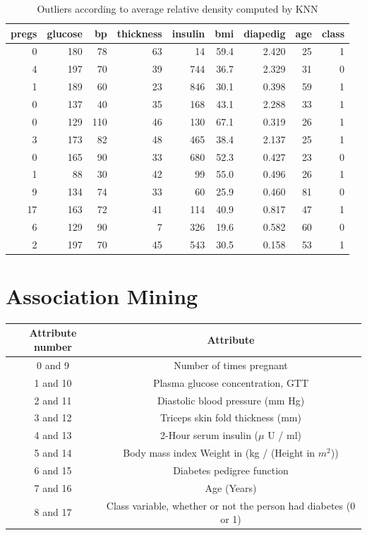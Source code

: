 \begin{table}[hbp]
\begin{tabular}{rrrrrrrrr}
pregs & glucose & bp & thickness & insulin & bmi & dia\textunderscore{}pedig & age & class\\
  \hline
0 & 180 & 78 & 63 & 14 & 59.4 & 2.420 & 25 & 1\\
4 & 197 & 70 & 39 & 744 & 36.7 & 2.329 & 31 & 0\\
1 & 189 & 60 & 23 & 846 & 30.1 & 0.398 & 59 & 1\\
0 & 137 & 40 & 35 & 168 & 43.1 & 2.288 & 33 & 1\\
0 & 129 & 110 & 46 & 130 & 67.1 & 0.319 & 26 & 1\\
3 & 173 & 82 & 48 & 465 & 38.4 & 2.137 & 25 & 1\\
0 & 165 & 90 & 33 & 680 & 52.3 & 0.427 & 23 & 0\\
1 & 88 & 30 & 42 & 99 & 55.0 & 0.496 & 26 & 1\\
9 & 134 & 74 & 33 & 60 & 25.9 & 0.460 & 81 & 0\\
17 & 163 & 72 & 41 & 114 & 40.9 & 0.817 & 47 & 1\\
6 & 129 & 90 & 7 & 326 & 19.6 & 0.582 & 60 & 0\\
2 & 197 & 70 & 45 & 543 & 30.5 & 0.158 & 53 & 1\\
\end{tabular}
\caption{Outliers according to average relative density computed by KNN}
\label{tab:outliers}
\end{table}


\section{Association Mining}

\begin{center}
 \begin{tabular}{||c c||}
 \hline
 Attribute number & Attribute \\ [0.5ex]
 \hline\hline
 0 and 9 & Number of times pregnant \\
 \hline
 1 and 10 & Plasma glucose concentration, GTT \\
 \hline
 2 and 11 & Diastolic blood pressure (mm Hg) \\
 \hline
 3 and 12 & Triceps skin fold thickness (mm) \\
 \hline
 4 and 13 & 2-Hour serum insulin ($\mu$ U / ml) \\
 \hline
 5 and 14 & Body mass index Weight in (kg / (Height in $m^2$)) \\
 \hline
 6 and 15 & Diabetes pedigree function \\
 \hline
 7 and 16 & Age (Years) \\
 \hline
 8 and 17 & Class variable, whether or not the person had diabetes (0 or 1) \\ [1ex]
 \hline
\end{tabular}
\end{center}

